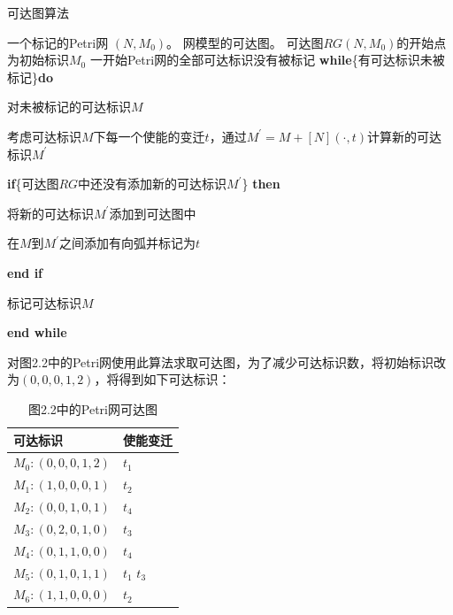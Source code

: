     \begin{algorithm}[H]
        \caption{可达图算法}
        \label{alg2-1}
        \begin{algorithmic}
            \Require 一个标记的Petri网 $(N, M_{0})$。 \notag
            \Ensure 网模型的可达图。
            \State 可达图$RG(N,M_{0})$的开始点为初始标识$M_{0}$
            \State 一开始Petri网的全部可达标识没有被标记
            \State \textbf{while}\{有可达标识未被标记\}\textbf{do}
                
                \State \hspace{0.8cm} 对未被标记的可达标识$M$
                
                \State \hspace{0.8cm} 考虑可达标识$M$下每一个使能的变迁$t$，通过$M^{\prime}=M+[N](\cdot,t)$计算新的可达标识$M^{\prime}$
                
                \State  \hspace{0.8cm} \textbf{if}\{可达图$RG$中还没有添加新的可达标识$M^{\prime}$\} \textbf{then}
                
                \State \hspace{1.4cm}  将新的可达标识$M^{\prime}$添加到可达图中
                
                \State \hspace{1.4cm}  在$M$到$M^{\prime}$之间添加有向弧并标记为$t$
                
                \State \hspace{0.8cm} \textbf{end if}
                
                \State  \hspace{0.8cm} 标记可达标识$M$
                
            \State  \textbf{end while}
            \EndProcedure
        \end{algorithmic}
    \end{algorithm}

    对图2.2中的Petri网使用此算法求取可达图，为了减少可达标识数，将初始标识改为$(0,0,0,1,2)$，将得到如下可达标识：

    \begin{table}[H]
        \centering
        \begin{tabular}{|l|l|}
        \hline
            可达标识 & 使能变迁 \\ \hline
            $M_0:(0,0,0,1,2)$ & $t_1$ \\ \hline
            $M_1:(1,0,0,0,1)$ & $t_2$ \\ \hline
            $M_2:(0,0,1,0,1)$ & $t_4$ \\ \hline
            $M_3:(0,2,0,1,0)$ & $t_3$ \\ \hline
            $M_4:(0,1,1,0,0)$ & $t_4$ \\ \hline
            $M_5:(0,1,0,1,1)$ & $t_1$ $t_3$ \\ \hline
            $M_6:(1,1,0,0,0)$ & $t_2$ \\ \hline
        \end{tabular}
        \caption{图2.2中的Petri网可达图}
    \end{table}

